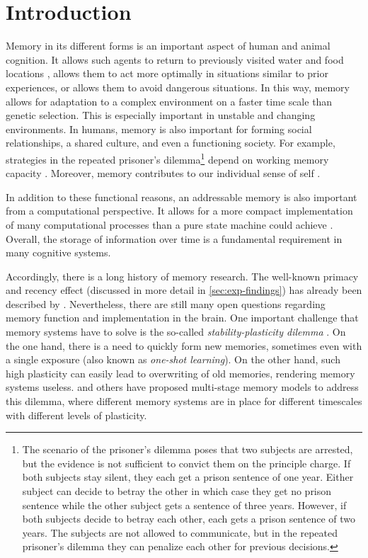 \chapter{Introduction}

Memory in its different forms is an important aspect of human and animal cognition.
It allows such agents to return to previously visited water and food locations \parencite{vorhees2014}, allows them to act more optimally in situations similar to prior experiences, or allows them to avoid dangerous situations.
In this way, memory allows for adaptation to a complex environment on a faster time scale than genetic selection.
This is especially important in unstable and changing environments.
In humans, memory is also important for forming social relationships, a shared culture, and even a functioning society.
For example, strategies in the repeated prisoner's
dilemma\footnote{The scenario of the prisoner's dilemma poses that two subjects are arrested, but the evidence is not sufficient to convict them on the principle charge. If both subjects stay silent, they each get a prison sentence of one year. Either subject can decide to betray the other in which case they get no prison sentence while the other subject gets a sentence of three years. However, if both subjects decide to betray each other, each gets a prison sentence of two years. The subjects are not allowed to communicate, but in the repeated prisoner's dilemma they can penalize each other for previous decisions.} depend on working memory capacity \parencite{milinski1998}.
Moreover, memory contributes to our individual sense of self \parencite{prebble2013}.

In addition to these functional reasons, an addressable memory is also important from a computational perspective.
It allows for a more compact implementation of many computational processes than a pure state machine could achieve \parencite{gallistel2009}.
Overall, the storage of information over time is a fundamental requirement in many cognitive systems.

Accordingly, there is a long history of memory research.
The well-known primacy and recency effect (discussed in more detail in \cref{sec:exp-findings}) has already been described by \textcite{Robinson1926}.
Nevertheless, there are still many open questions regarding memory function and implementation in the brain.
One important challenge that memory systems have to solve is the so-called \emph{stability-plasticity dilemma} \parencite{Abraham2005}.
On the one hand, there is a need to quickly form new memories, sometimes even with a single exposure (also known as \emph{one-shot learning}).
On the other hand, such high plasticity can easily lead to overwriting of old memories, rendering memory systems useless.
\Textcite{Buzsaki1989} and others have proposed multi-stage memory models to address this dilemma, where different memory systems are in place for different timescales with different levels of plasticity.

